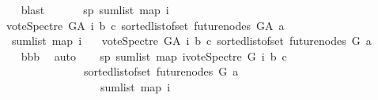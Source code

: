 \begin{isabellebody}
\ \ \ \ \isamarkupfalse%
\ blast\ \isanewline
\ \ \isamarkupfalse%
\ \isamarkupfalse%
\ sp{}{\isacharcolon}{\kern0pt}\ {\isachardoublequoteopen}sum{\isacharunderscore}{\kern0pt}list\ {\isacharparenleft}{\kern0pt}map\ {\isacharparenleft}{\kern0pt}{\isasymlambda}i{\isachardot}{\kern0pt}\isanewline
\ \ \ {\isacharparenleft}{\kern0pt}vote{\isacharunderscore}{\kern0pt}Spectre\ G{\isacharunderscore}{\kern0pt}A\ i\ b\ c{\isacharparenright}{\kern0pt}{\isacharparenright}{\kern0pt}\ {\isacharparenleft}{\kern0pt}sorted{\isacharunderscore}{\kern0pt}list{\isacharunderscore}{\kern0pt}of{\isacharunderscore}{\kern0pt}set\ {\isacharparenleft}{\kern0pt}future{\isacharunderscore}{\kern0pt}nodes\ G{\isacharunderscore}{\kern0pt}A\ a{\isacharparenright}{\kern0pt}{\isacharparenright}{\kern0pt}{\isacharparenright}{\kern0pt}\ {\isacharequal}{\kern0pt}\ \isanewline
\ \ \ \ sum{\isacharunderscore}{\kern0pt}list\ {\isacharparenleft}{\kern0pt}map\ {\isacharparenleft}{\kern0pt}{\isasymlambda}i{\isachardot}{\kern0pt}\isanewline
\ \ \ {\isacharparenleft}{\kern0pt}vote{\isacharunderscore}{\kern0pt}Spectre\ G{\isacharunderscore}{\kern0pt}A\ i\ b\ c{\isacharparenright}{\kern0pt}{\isacharparenright}{\kern0pt}\ {\isacharparenleft}{\kern0pt}sorted{\isacharunderscore}{\kern0pt}list{\isacharunderscore}{\kern0pt}of{\isacharunderscore}{\kern0pt}set\ {\isacharparenleft}{\kern0pt}future{\isacharunderscore}{\kern0pt}nodes\ G\ a{\isacharparenright}{\kern0pt}{\isacharparenright}{\kern0pt}{\isacharparenright}{\kern0pt}\ {\isacharplus}{\kern0pt}\ {}{\isachardoublequoteclose}\ \isanewline
\ \ \ \ \isamarkupfalse%
\ bbb\ \isamarkupfalse%
\ auto\isanewline
\ \ \isamarkupfalse%
\ sp{}{\isacharcolon}{\kern0pt}\ {\isachardoublequoteopen}sum{\isacharunderscore}{\kern0pt}list\ {\isacharparenleft}{\kern0pt}map\ {\isacharparenleft}{\kern0pt}{\isasymlambda}i{\isachardot}{\kern0pt}{\isacharparenleft}{\kern0pt}vote{\isacharunderscore}{\kern0pt}Spectre\ G\ i\ b\ c{\isacharparenright}{\kern0pt}{\isacharparenright}{\kern0pt}\isanewline
\ \ \ \ \ \ \ \ \ \ \ \ \ \ \ \ \ {\isacharparenleft}{\kern0pt}sorted{\isacharunderscore}{\kern0pt}list{\isacharunderscore}{\kern0pt}of{\isacharunderscore}{\kern0pt}set\ {\isacharparenleft}{\kern0pt}future{\isacharunderscore}{\kern0pt}nodes\ G\ a{\isacharparenright}{\kern0pt}{\isacharparenright}{\kern0pt}{\isacharparenright}{\kern0pt}\ \isanewline
\ \ \ \ \ \ \ \ \ \ \ \ \ \ \ \ \ \ {\isasymle}\ \ sum{\isacharunderscore}{\kern0pt}list\ {\isacharparenleft}{\kern0pt}map\ {\isacharparenleft}{\kern0pt}{\isasymlambda}i{\isachardot}{\kern0pt}\isanewline

\end{isabellebody}

